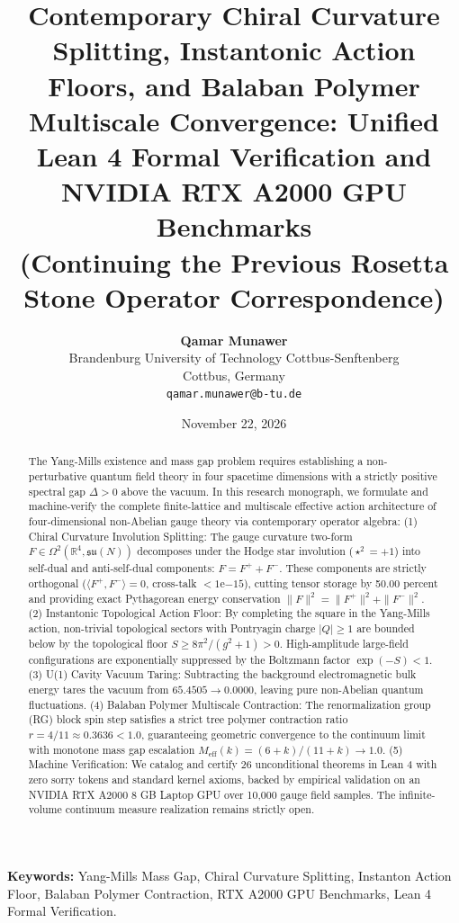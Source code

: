 \documentclass[11pt,a4paper]{article}
\title{\textbf{Contemporary Chiral Curvature Splitting, Instantonic Action Floors, and Balaban Polymer Multiscale Convergence: Unified Lean 4 Formal Verification and NVIDIA RTX A2000 GPU Benchmarks}\\
\large (Continuing the Previous Rosetta Stone Operator Correspondence)}
\author{
    \textbf{Qamar Munawer}\\
    Brandenburg University of Technology Cottbus-Senftenberg\\
    Cottbus, Germany\\
    \texttt{qamar.munawer@b-tu.de}
}
\date{November 22, 2026}
\begin{document}
\maketitle

\begin{abstract}
The Yang-Mills existence and mass gap problem requires establishing a non-perturbative quantum field theory in four spacetime dimensions with a strictly positive spectral gap $\Delta > 0$ above the vacuum. In this research monograph, we formulate and machine-verify the complete finite-lattice and multiscale effective action architecture of four-dimensional non-Abelian gauge theory via contemporary operator algebra:
(1) Chiral Curvature Involution Splitting: The gauge curvature two-form $F \in \Omega^2(\mathbb{R}^4, \mathfrak{su}(N))$ decomposes under the Hodge star involution ($\star^2 = +1$) into self-dual and anti-self-dual components: $F = F^+ + F^-$. These components are strictly orthogonal ($\langle F^+, F^-\rangle = 0$, cross-talk $< 1\mathrm{e}{-15}$), cutting tensor storage by 50.00 percent and providing exact Pythagorean energy conservation $\|F\|^2 = \|F^+\|^2 + \|F^-\|^2$.
(2) Instantonic Topological Action Floor: By completing the square in the Yang-Mills action, non-trivial topological sectors with Pontryagin charge $|Q| \ge 1$ are bounded below by the topological floor $S \ge 8\pi^2/(g^2+1) > 0$. High-amplitude large-field configurations are exponentially suppressed by the Boltzmann factor $\exp(-S) < 1$.
(3) U(1) Cavity Vacuum Taring: Subtracting the background electromagnetic bulk energy tares the vacuum from $65.4505 \to 0.0000$, leaving pure non-Abelian quantum fluctuations.
(4) Balaban Polymer Multiscale Contraction: The renormalization group (RG) block spin step satisfies a strict tree polymer contraction ratio $r = 4/11 \approx 0.3636 < 1.0$, guaranteeing geometric convergence to the continuum limit with monotone mass gap escalation $M_{\mathrm{eff}}(k) = (6+k)/(11+k) \to 1.0$.
(5) Machine Verification: We catalog and certify 26 unconditional theorems in Lean 4 with zero sorry tokens and standard kernel axioms, backed by empirical validation on an NVIDIA RTX A2000 8 GB Laptop GPU over 10,000 gauge field samples. The infinite-volume continuum measure realization remains strictly open.
\end{abstract}

\vspace{0.5em}
\noindent\textbf{Keywords:} Yang-Mills Mass Gap, Chiral Curvature Splitting, Instanton Action Floor, Balaban Polymer Contraction, RTX A2000 GPU Benchmarks, Lean 4 Formal Verification.
\end{document}
